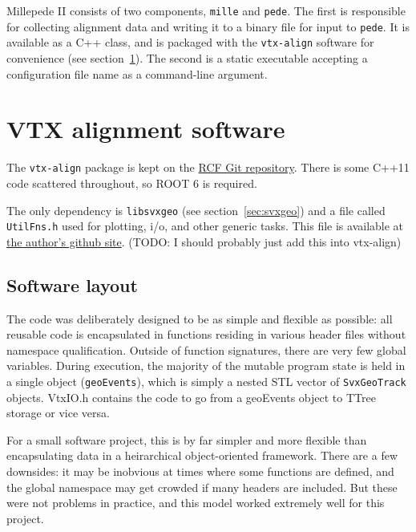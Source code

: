 \documentclass[12pt]{article}
\begin{document}
Millepede II consists of two components, \texttt{mille} and \texttt{pede}. The first is responsible for collecting alignment data and writing it to a binary file for input to \texttt{pede}. It is available as a C++ class, and is packaged with the \texttt{vtx-align} software for convenience (see section~\ref{sec:vtxalign}). The second is a static executable accepting a configuration file name as a command-line argument.

\section{VTX alignment software} \label{sec:vtxalign}
The \texttt{vtx-align} package is kept on the \href{https://git.racf.bnl.gov/phenix/cgit/vtx-align/vtx-align.git}{RCF Git repository}. There is some C++11 code scattered throughout, so ROOT 6 is required. 

The only dependency is \texttt{libsvxgeo} (see section~\ref{sec:svxgeo}) and a file called \texttt{UtilFns.h} used for plotting, i/o, and other generic tasks. This file is available at \href{https://github.com/andrewadare/utils.git}{the author's github site}. (TODO: I should probably just add this into vtx-align)

\subsection{Software layout}
The code was deliberately designed to be as simple and flexible as possible: all reusable code is encapsulated in functions residing in various header files without namespace qualification. Outside of function signatures, there are very few global variables. During execution, the majority of the mutable program state is held in a single object (\texttt{geoEvents}), which is simply a nested STL vector of \texttt{SvxGeoTrack} objects. VtxIO.h contains the code to go from a geoEvents object to TTree storage or vice versa.

For a small software project, this is by far simpler and more flexible than encapsulating data in a heirarchical object-oriented framework. There are a few downsides: it may be inobvious at times where some functions are defined, and the global namespace may get crowded if many headers are included. But these were not problems in practice, and this model worked extremely well for this project.
\end{document}
